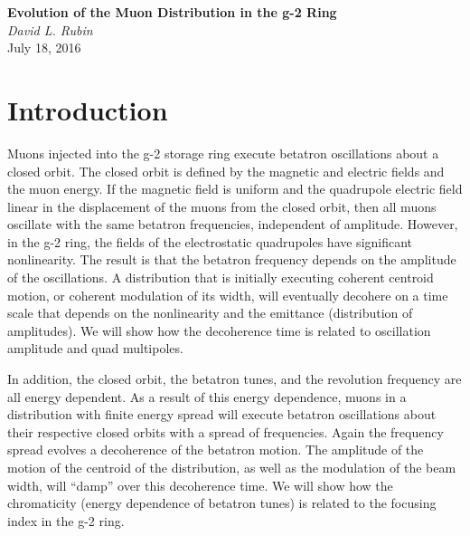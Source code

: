 \documentclass[10pt]{article}
\begin{document}
\begin{flushleft}
{\bf \Large Evolution of the Muon Distribution in the g-2 Ring}\\
\vskip 0.1in
{\it David L. Rubin}\\
\vskip 0.1in
July 18, 2016\\
\end{flushleft}

\section{Introduction}
Muons injected into the g-2 storage ring execute betatron oscillations about a closed orbit. The closed orbit is defined by the magnetic and
electric fields and the muon energy. If the magnetic field is uniform and the quadrupole electric field linear in the displacement of the muons from the closed 
orbit, 
then all muons oscillate with the same betatron frequencies, independent of amplitude. However, in the g-2 ring, the fields of the electrostatic quadrupoles
have significant nonlinearity. The result is that the betatron frequency depends on the amplitude of the oscillations. A distribution that is initially executing
coherent centroid motion, or coherent modulation of its width, will eventually decohere on a time scale that depends on the nonlinearity and the emittance (distribution of
amplitudes). We will show
how the decoherence time is related to oscillation amplitude and quad multipoles. 

In addition, the closed orbit,
the betatron tunes, and the revolution frequency are all energy dependent. As a result of this energy dependence, muons in a distribution with finite
energy spread
will execute betatron oscillations about their respective closed orbits 
with a spread of frequencies. Again the frequency spread evolves a decoherence of the betatron motion. The amplitude of the motion of the 
centroid of the distribution, as well as the modulation of the beam width,  will ``damp'' over this decoherence time.
We will show 
how the chromaticity (energy dependence of betatron tunes)
is related to the focusing index in the g-2 ring.
\end{document}
